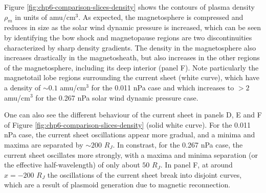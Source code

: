 Figure \ref{fig:chp6-comparison-slices-density} shows the contours of plasma density $\rho_m$ in units of amu/cm$^3$. As expected, the magnetosphere is compressed and reduces in size as the solar wind dynamic pressure is increased, which can be seen by identifying the bow shock and magnetopause regions are two discontinuities characterized by sharp density gradients. The density in the magnetosphere also increases drastically in the magnetosheath, but also increases in the other regions of the magnetosphere, including its deep interior (panel F). Note particularly the magnetotail lobe regions surrounding the current sheet (white curve), which have a density of $\sim0.1$ amu/cm$^3$ for the 0.011 nPa case and which increases to $>2$ amu/cm$^3$ for the 0.267 nPa solar wind dynamic pressure case. 

One can also see the different behaviour of the current sheet in panels D, E and F of Figure \ref{fig:chp6-comparison-slices-density} (solid white curve). For the 0.011 nPa case, the current sheet oscillations appear more gradual, and a minima and maxima are separated by $\sim200$ $R_J$. In constrast, for the 0.267 nPa case, the current sheet oscillates more strongly, with a maxima and minima separation (or the effective half-wavelength) of only about $50$ $R_J$. In panel F, at around $x=-200$ $R_J$ the oscillations of the current sheet break into disjoint curves, which are a result of plasmoid generation due to magnetic reconnection.  

